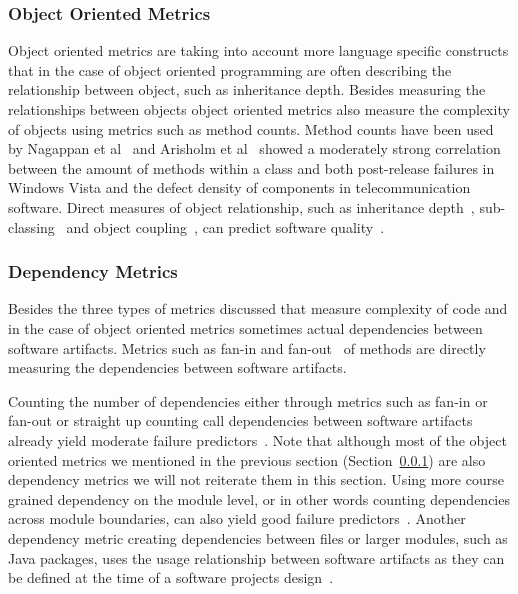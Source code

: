\subsubsection{Object Oriented Metrics}
\label{chap:6:sub:oom}
Object oriented metrics are taking into account more language specific constructs that in the case of object oriented programming are often describing the relationship between object, such as inheritance depth.
Besides measuring the relationships between objects object oriented metrics also measure the complexity of objects using metrics such as method counts.
Method counts have been used by Nagappan et al~\cite{nagappan:icse:2006} and Arisholm et al~\cite{arisholm:isese:2006} showed a moderately strong correlation between the amount of methods within a class and both post-release failures in Windows Vista and the defect density of components in telecommunication software.
%
Direct measures of object relationship, such as inheritance depth~\cite{chidamber:tse:1994}, sub-classing~\cite{chidamber:tse:1994} and object coupling~\cite{chidamber:tse:1994}, can predict software quality~\cite{nagappan:icse:2006,arisholm:isese:2006,english:promise:2009}.



\subsubsection{Dependency Metrics}
\label{chap:6:sub:depmet}
Besides the three types of metrics discussed that measure complexity of code and in the case of object oriented metrics sometimes actual dependencies between software artifacts.
Metrics such as fan-in and fan-out~\cite{henry:tse:1981} of methods are directly measuring the dependencies between software artifacts.

Counting the number of dependencies either through metrics such as fan-in or fan-out or straight up counting call dependencies between software artifacts already yield moderate failure predictors~\cite{cataldo:icse:2011,nagappan:icse:2006,arisholm:isese:2006,knab:msr:2006,shin:msr:2009}.
Note that although most of the object oriented metrics we mentioned in the previous section (Section~\ref{chap:6:sub:oom}) are also dependency metrics we will not reiterate them in this section. 
Using more course grained dependency on the module level, or in other words counting dependencies across module boundaries, can also yield good failure predictors~\cite{jiang:promise:2008}.
Another dependency metric creating dependencies between files or larger modules, such as Java packages, uses the usage relationship between software artifacts as they can be defined at the time of a software projects design~\cite{schroeter:isese:2006,dualaekoko:esem:2009}.


